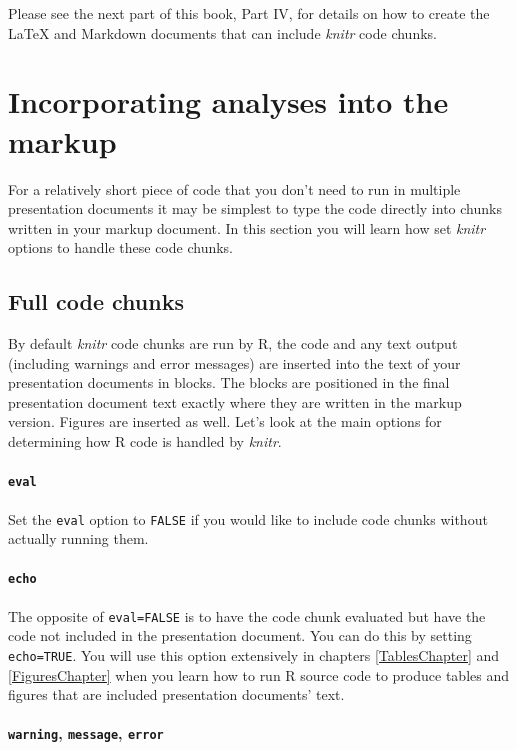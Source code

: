 Please see the next part of this book, Part IV, for details on how to create the LaTeX and Markdown documents that can include {\emph{knitr}} code chunks.

\section{Incorporating analyses into the markup}

For a relatively short piece of code that you don't need to run in multiple presentation documents it may be simplest to type the code directly into chunks written in your markup document. In this section you will learn how set {\emph{knitr}} options to handle these code chunks.

\subsection{Full code chunks}

By default {\emph{knitr}} code chunks are run by R, the code and any text output (including warnings and error messages) are inserted into the text of your presentation documents in blocks. The blocks are positioned in the final presentation document text exactly where they are written in the markup version. Figures are inserted as well. Let's look at the main options for determining how R code is handled by {\emph{knitr}}.

\paragraph{{\tt{eval}}}

Set the \texttt{eval} option to \texttt{FALSE} if you would like to include code chunks without actually running them.

\paragraph{{\tt{echo}}}

The opposite of \texttt{eval=FALSE} is to have the code chunk evaluated but have the code not included in the presentation document. You can do this by setting \texttt{echo=TRUE}. You will use this option extensively in chapters \ref{TablesChapter} and \ref{FiguresChapter} when you learn how to run R source code to produce tables and figures that are included presentation documents' text.

\paragraph{{\tt{warning}}, {\tt{message}}, {\tt{error}}}

